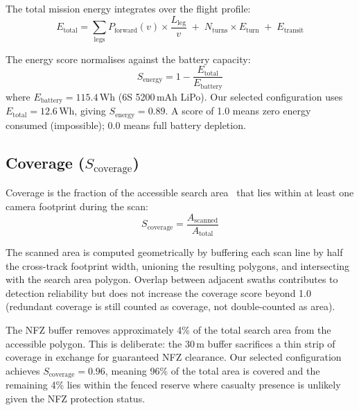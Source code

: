 \documentclass[10pt,a4paper]{article}
\begin{document}
The total mission energy integrates over the flight profile:
\begin{equation}
  E_\text{total} = \sum_{\text{legs}} P_\text{forward}(v) \times \frac{L_\text{leg}}{v} \;+\; N_\text{turns} \times E_\text{turn} \;+\; E_\text{transit}
\end{equation}

The energy score normalises against the battery capacity:
\begin{equation}\label{eq:energy-score}
  S_\text{energy} = 1 - \frac{E_\text{total}}{E_\text{battery}}
\end{equation}
where $E_\text{battery} = 115.4$\,Wh (6S 5200\,mAh LiPo). Our selected configuration uses $E_\text{total} = 12.6$\,Wh, giving $S_\text{energy} = 0.89$. A score of 1.0 means zero energy consumed (impossible); 0.0 means full battery depletion.

\subsection{Coverage (\texorpdfstring{$S_\text{coverage}$}{S\_coverage})}\label{sec:score-coverage}

Coverage is the fraction of the accessible search area~\citep{boustrophedon,covpath} that lies within at least one camera footprint during the scan:
\begin{equation}\label{eq:coverage-score}
  S_\text{coverage} = \frac{A_\text{scanned}}{A_\text{total}}
\end{equation}

The scanned area is computed geometrically by buffering each scan line by half the cross-track footprint width, unioning the resulting polygons, and intersecting with the search area polygon. Overlap between adjacent swaths contributes to detection reliability but does not increase the coverage score beyond 1.0 (redundant coverage is still counted as coverage, not double-counted as area).

The NFZ buffer removes approximately 4\% of the total search area from the accessible polygon. This is deliberate: the 30\,m buffer sacrifices a thin strip of coverage in exchange for guaranteed NFZ clearance. Our selected configuration achieves $S_\text{coverage} = 0.96$, meaning 96\% of the total area is covered and the remaining 4\% lies within the fenced reserve where casualty presence is unlikely given the NFZ protection status.

\end{document}
